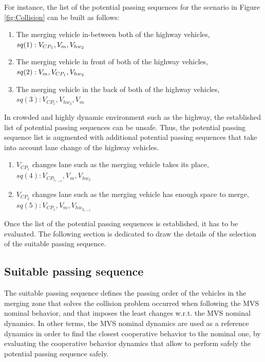 For instance, the list of the potential passing sequences for the scenario in Figure \ref{fig:Collision} can be built as follows: 
\begin{enumerate}
    \item The merging vehicle in-between both of the highway vehicles, $sq(1): V_{CP_1}, \\V_m, V_{hw_2} $
    \item The merging vehicle in front of both of the highway vehicles, $sq(2): V_m,V_{CP_1},\\ V_{hw_2}  $
    \item The merging vehicle in the back of both of the highway vehicles, $sq(3): V_{CP_1}, V_{hw_2},V_m $
\end{enumerate}

In crowded and highly dynamic environment such as the highway, the established list of potential passing sequences can be unsafe. Thus, the potential passing sequence list is augmented with additional potential passing sequences that take into account lane change of the highway vehicles. 

\begin{enumerate}
    \item $V_{CP_1}$ changes lane such as the merging vehicle takes its place, $sq(4): V_{CP_{1_{1\rightarrow 2}}}, V_m, V_{hw_2} $
    \item $V_{CP_2}$ changes lane such as the merging vehicle has enough space to merge, $sq(5): V_{CP_1}, V_m, V_{hw_{2_{1\rightarrow 2}}} $
\end{enumerate}

Once the list of the potential passing sequences is established, it has to be evaluated. The following section is dedicated to draw the details of the selection of the suitable passing sequence. 


\subsection{Suitable passing sequence}\label{sec:suitable_sq}
The suitable passing sequence defines the passing order of the vehicles in the merging zone that solves the collision problem occurred when following the MVS nominal behavior, and that imposes the least changes w.r.t. the MVS nominal dynamics. In other terms, the MVS nominal dynamics are used as a reference dynamics in order to find the closest cooperative behavior to the nominal one, by evaluating the cooperative behavior dynamics that allow to perform safely the potential passing sequence safely.  



